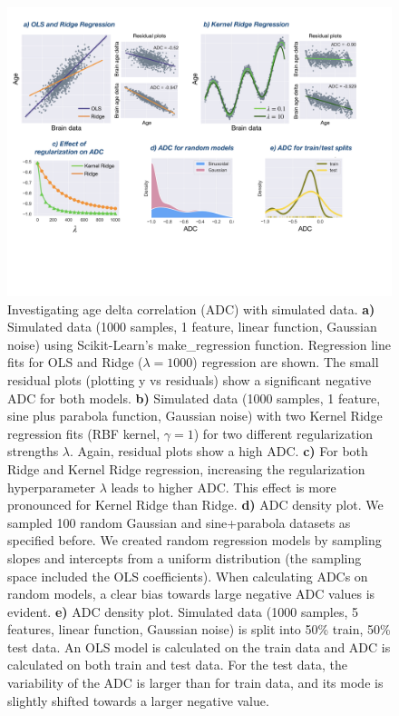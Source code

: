 \documentclass[utf8]{frontiersSCNS} %
\begin{document}
\begin{figure}[!h]
\begin{center}
\includegraphics[width=1.\textwidth]{figures/ADC.jpeg}
\end{center}
\caption{Investigating age delta correlation (ADC)  with simulated data. \textbf{a)} Simulated data (1000 samples, 1 feature, linear function, Gaussian noise) using Scikit-Learn's make\_regression function. Regression line fits for OLS and Ridge ($\lambda=1000$) regression are shown. The small residual plots (plotting y vs residuals) show a significant negative ADC for both models. \textbf{b)} Simulated data (1000 samples, 1 feature, sine plus parabola function, Gaussian noise) with two Kernel Ridge regression fits (RBF kernel, $\gamma=1$) for two different regularization strengths $\lambda$. Again, residual plots show a high ADC. \textbf{c)} For both Ridge and Kernel Ridge regression, increasing the regularization hyperparameter $\lambda$ leads to higher ADC. This effect is more pronounced for Kernel Ridge than Ridge. \textbf{d)} ADC density plot. We sampled 100 random Gaussian and sine+parabola datasets as specified before. We created random regression models by  sampling slopes and intercepts from a uniform distribution (the sampling space included the OLS coefficients). When calculating ADCs on random models, a clear bias towards large negative ADC values is evident. \textbf{e)} ADC density plot. Simulated data (1000 samples, 5 features, linear function, Gaussian noise) is split into 50\% train, 50\% test data. An OLS model is calculated on the train data and ADC is calculated on both train and test data. For the test data, the variability of the ADC is larger than for train data, and its mode is slightly shifted towards a larger negative value.}\label{fig:ADC}
\end{figure}
\end{document}
